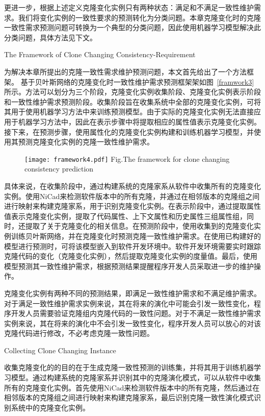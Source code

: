 更进一步，根据上述定义克隆变化实例只有两种状态：满足和不满足一致性维护需求。我们将变化实例的一致性要求的预测转化为分类问题。本章克隆变化时的克隆一致性需求预测问题可转换为一个典型的分类问题，因此使用机器学习模型解决此分类问题，具体方法见下文。

{The Framework of Clone Changing Consistency-Requirement}

为解决本章所提出的克隆一致性需求维护预测问题，本文首先给出了一个方法框架。
基于贝叶斯网络的克隆变化时一致性维护需求预测框架架如图~\ref{framwork3}所示。方法可以划分为三个阶段，克隆变化实例收集阶段、克隆变化实例表示阶段和一致性维护需求预测阶段。收集阶段旨在收集系统中全部的克隆变化实例，可将其用于使用机器学习方法中来训练预测模型。由于实际的克隆变化实例无法直接应用于机器学习方法中，因此在表示步骤中将提取相应的属性值表示克隆变化实例。接下来，在预测步骤，使用属性化的克隆变化实例构建和训练机器学习模型，并使用其预测克隆变化实例的克隆一致性维护需求。

\begin{figure}[htbp]
\centering
\texttt{[image: framework4.pdf]}
{Fig.$\!$}{The framework for clone changing consistency prediction}
\vspace{-1em}
\end{figure}

具体来说，在收集阶段中，通过构建系统的克隆家系从软件中收集所有的克隆变化实例。使用NiCad来检测软件版本中的所有克隆，并通过在相邻版本的克隆组之间进行映射来构建克隆家系，用于识别克隆变化实例。在表示阶段中，通过提取属性值表示克隆变化实例，提取了代码属性、上下文属性和历史属性三组属性组，同时，还提取了关于克隆变化的相关信息。在预测阶段中，使用收集到的克隆变化实例训练贝叶斯网络，并在克隆变化时预测克隆一致性维护需求。在使用已构建好的模型进行预测时，可将该模型嵌入到软件开发环境中。软件开发环境需要实时跟踪克隆代码的变化（克隆变化实例），然后提取克隆变化实例的度量值。最后，使用模型预测其一致性维护需求，根据预测结果提醒程序开发人员采取进一步的维护操作。

克隆变化实例有两种不同的预测结果，即满足一致性维护需求和不满足维护需求。对于满足一致性维护需求实例来说，其在将来的演化中可能会引发一致性变化，程序开发人员需要验证克隆组内克隆代码的一致性问题。对于不满足一致性维护需求实例来说，其在将来的演化中不会引发一致性变化，程序开发人员可以放心的对该克隆代码进行修改，不必考虑克隆一致性问题。


{Collecting Clone Changing Instance}

收集克隆变化的的目的在于生成克隆一致性预测的训练集，并将其用于训练机器学习模型。通过构建系统的克隆家系并识别其中的克隆演化模式，可以从软件中收集所有的克隆变化实例。首先使用NiCad来检测软件版本中的所有克隆，然后通过在相邻版本的克隆组之间进行映射来构建克隆家系，最后识别克隆一致性演化模式识别系统中的克隆变化实例。


